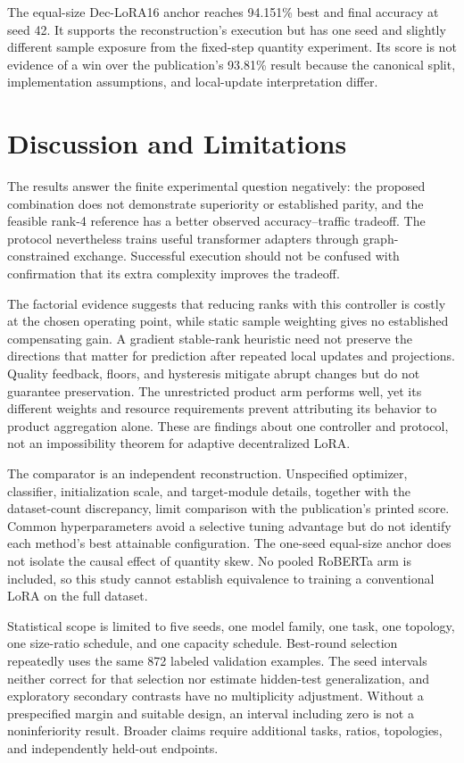 \documentclass[11pt]{article}
\begin{document}
The equal-size Dec-LoRA16 anchor reaches 94.151\% best and final accuracy at seed 42. It supports the reconstruction's execution but has one seed and slightly different sample exposure from the fixed-step quantity experiment. Its score is not evidence of a win over the publication's 93.81\% result because the canonical split, implementation assumptions, and local-update interpretation differ.

\section{Discussion and Limitations}
The results answer the finite experimental question negatively: the proposed combination does not demonstrate superiority or established parity, and the feasible rank-4 reference has a better observed accuracy--traffic tradeoff. The protocol nevertheless trains useful transformer adapters through graph-constrained exchange. Successful execution should not be confused with confirmation that its extra complexity improves the tradeoff.

The factorial evidence suggests that reducing ranks with this controller is costly at the chosen operating point, while static sample weighting gives no established compensating gain. A gradient stable-rank heuristic need not preserve the directions that matter for prediction after repeated local updates and projections. Quality feedback, floors, and hysteresis mitigate abrupt changes but do not guarantee preservation. The unrestricted product arm performs well, yet its different weights and resource requirements prevent attributing its behavior to product aggregation alone. These are findings about one controller and protocol, not an impossibility theorem for adaptive decentralized LoRA.

The comparator is an independent reconstruction. Unspecified optimizer, classifier, initialization scale, and target-module details, together with the dataset-count discrepancy, limit comparison with the publication's printed score. Common hyperparameters avoid a selective tuning advantage but do not identify each method's best attainable configuration. The one-seed equal-size anchor does not isolate the causal effect of quantity skew. No pooled RoBERTa arm is included, so this study cannot establish equivalence to training a conventional LoRA on the full dataset.

Statistical scope is limited to five seeds, one model family, one task, one topology, one size-ratio schedule, and one capacity schedule. Best-round selection repeatedly uses the same 872 labeled validation examples. The seed intervals neither correct for that selection nor estimate hidden-test generalization, and exploratory secondary contrasts have no multiplicity adjustment. Without a prespecified margin and suitable design, an interval including zero is not a noninferiority result. Broader claims require additional tasks, ratios, topologies, and independently held-out endpoints.
\end{document}
